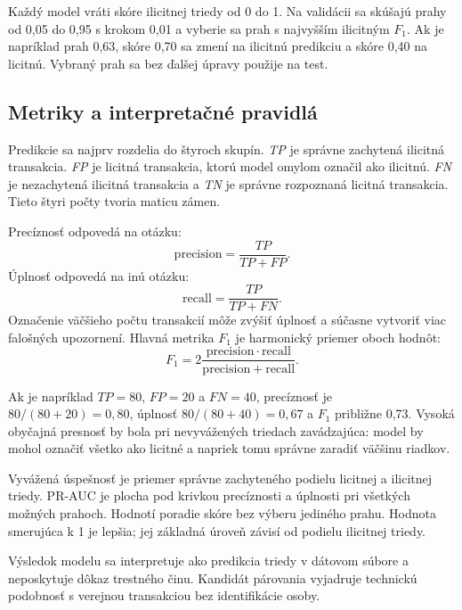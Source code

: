 Každý model vráti skóre ilicitnej triedy od 0 do 1. Na validácii sa
skúšajú prahy od 0,05 do 0,95 s krokom 0,01 a vyberie sa prah s
najvyšším ilicitným $F_1$. Ak je napríklad prah 0,63, skóre 0,70 sa
zmení na ilicitnú predikciu a skóre 0,40 na licitnú. Vybraný prah sa
bez ďalšej úpravy použije na test.

\subsection{Metriky a interpretačné pravidlá}

Predikcie sa najprv rozdelia do štyroch skupín. \emph{TP} je správne
zachytená ilicitná transakcia. \emph{FP} je licitná transakcia, ktorú
model omylom označil ako ilicitnú. \emph{FN} je nezachytená ilicitná
transakcia a \emph{TN} je správne rozpoznaná licitná transakcia. Tieto
štyri počty tvoria maticu zámen.

Precíznosť odpovedá na otázku: 
\begin{equation}
  \mathrm{precision}=\frac{TP}{TP+FP}.
\end{equation}
Úplnosť odpovedá na inú otázku: 
\begin{equation}
  \mathrm{recall}=\frac{TP}{TP+FN}.
\end{equation}
Označenie väčšieho počtu transakcií môže zvýšiť úplnosť a súčasne
vytvoriť viac falošných upozornení. Hlavná metrika $F_1$ je
harmonický priemer oboch hodnôt:
\begin{equation}
  F_1 = 2\frac{\mathrm{precision}\cdot\mathrm{recall}}
  {\mathrm{precision}+\mathrm{recall}}.
\end{equation}

Ak je napríklad $TP=80$, $FP=20$ a $FN=40$, precíznosť je
$80/(80+20)=0{,}80$, úplnosť $80/(80+40)=0{,}67$ a $F_1$ približne
0,73. Vysoká obyčajná presnosť by bola pri nevyvážených triedach
zavádzajúca: model by mohol označiť všetko ako licitné a napriek tomu
správne zaradiť väčšinu riadkov.

Vyvážená úspešnosť je priemer správne zachyteného podielu licitnej a
ilicitnej triedy. PR-AUC je plocha pod krivkou precíznosti a úplnosti
pri všetkých možných prahoch. Hodnotí poradie skóre bez výberu jediného
prahu. Hodnota smerujúca k 1 je
lepšia; jej základná úroveň závisí od podielu ilicitnej triedy.

Výsledok modelu sa interpretuje ako predikcia triedy v dátovom súbore
a neposkytuje dôkaz trestného činu. Kandidát párovania vyjadruje
technickú podobnosť s verejnou transakciou bez identifikácie osoby.
